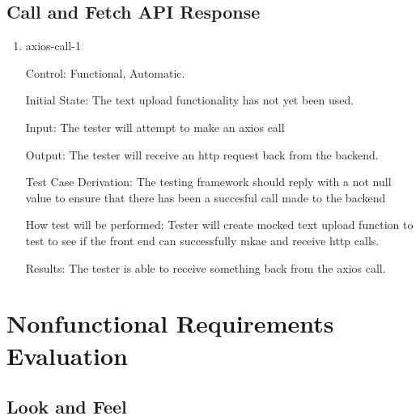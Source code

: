 \documentclass[12pt, titlepage]{article}
\begin{document}
	\subsection{Call and Fetch API Response}
	\begin{enumerate}
		\item{axios-call-1\\}
		
		Control: Functional, Automatic.
		
		Initial State: The text upload functionality has not yet been used.
		
		Input: The tester will attempt to make an axios call
		
		Output: The tester will receive an http request back from the backend.
		
		Test Case Derivation: The testing framework should reply with a not null value to ensure that there has been a succesful call made to the backend
		
		How test will be performed: Tester will create mocked text upload function to test to see if the front end can successfully mkae and receive http calls. 

		Results: The tester is able to receive something back from the axios call.
	\end{enumerate}


	\section{Nonfunctional Requirements Evaluation}
	
	\subsection{Look and Feel}
	
\end{document}
